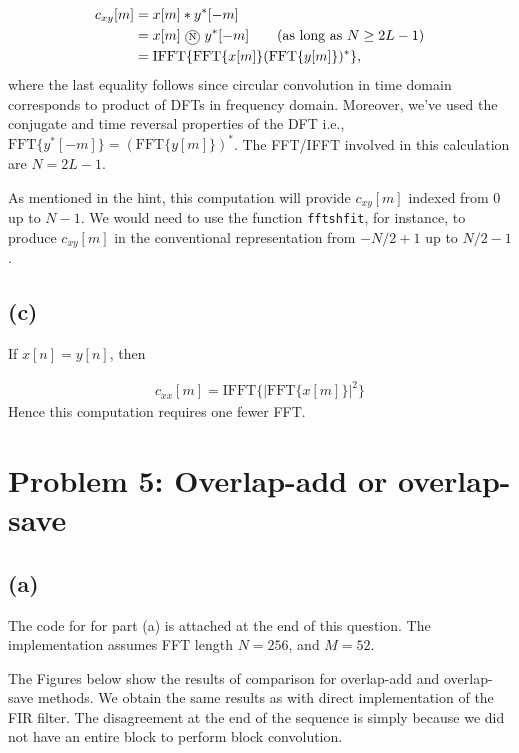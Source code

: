 \documentclass{article}
\begin{document}
\begin{align*}
	c_{xy}[m] &= x[m] \ast y^*[-m] \\
	&= x[m]~\encircle{N}~y^*[-m] \tag{as long as $N \geq 2L - 1$} \\
	&= \mathrm{IFFT}\{\mathrm{FFT}\{x[m]\}(\mathrm{FFT}\{y[m]\})^*\} ,
\end{align*}
where the last equality follows since circular convolution in time domain corresponds to product of DFTs in frequency domain. Moreover, we've used the conjugate and time reversal properties of the DFT i.e., $\mathrm{FFT}\{y^*[-m]\} = (\mathrm{FFT}\{y[m]\})^*$. The FFT/IFFT involved in this calculation are $N = 2L-1$.

As mentioned in the hint, this computation will provide $c_{xy}[m]$ indexed from $0$ up to $N-1$. We would need to use the function \texttt{fftshfit}, for instance, to produce $c_{xy}[m]$ in the conventional representation from $-N/2+1$ up to $N/2-1$.

\subsection{(c)}

If $x[n] = y[n]$, then 

\begin{align}
c_{xx}[m] = \mathrm{IFFT}\{|\mathrm{FFT}\{x[m]\}|^2\}
\end{align}
Hence this computation requires one fewer FFT.

\section{Problem 5: Overlap-add or overlap-save}	
\subsection{(a)}

The code for for part (a) is attached at the end of this question. The implementation assumes FFT length $N = 256$, and $M = 52$.

The Figures below show the results of comparison for overlap-add and overlap-save methods. We obtain the same results as with direct implementation of the FIR filter. The disagreement at the end of the sequence is simply because we did not have an entire block to perform block convolution. 
\end{document}
